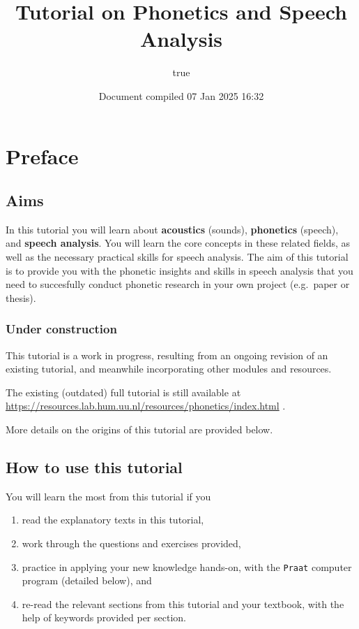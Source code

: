 \documentclass[
]{book}
\title{Tutorial on Phonetics and Speech Analysis}
\author{true}
\date{Document compiled 07 Jan 2025 16:32}
\providecommand{\tightlist}{%
  \setlength{\itemsep}{0pt}\setlength{\parskip}{0pt}}
\begin{document}
\maketitle

{
\setcounter{tocdepth}{1}
\tableofcontents
}
\chapter*{Preface}\label{preface}

\section*{Aims}\label{aims}

In this tutorial you will learn about \textbf{acoustics} (sounds), \textbf{phonetics} (speech), and \textbf{speech analysis}.
You will learn the core concepts in these related fields, as well as the necessary practical skills for speech analysis.
The aim of this tutorial is to provide you with the phonetic insights and skills in speech analysis that you need to succesfully conduct phonetic research in your own project (e.g.~paper or thesis).

\subsection*{Under construction}\label{under-construction}

This tutorial is a work in progress, resulting from an ongoing revision of an existing tutorial, and meanwhile incorporating other modules and resources.

The existing (outdated) full tutorial is still available at \url{https://resources.lab.hum.uu.nl/resources/phonetics/index.html}
.

More details on the origins of this tutorial are provided below.

\section*{How to use this tutorial}\label{how-to-use-this-tutorial}

You will learn the most from this tutorial if you

\begin{enumerate}
\def\labelenumi{(\arabic{enumi})}
\tightlist
\item
  read the explanatory texts in this tutorial,
\item
  work through the questions and exercises provided,
\item
  practice in applying your new knowledge hands-on, with the \texttt{Praat} computer program (detailed below), and
\item
  re-read the relevant sections from this tutorial and your textbook, with the help of keywords provided per section.
\end{enumerate}
\end{document}
